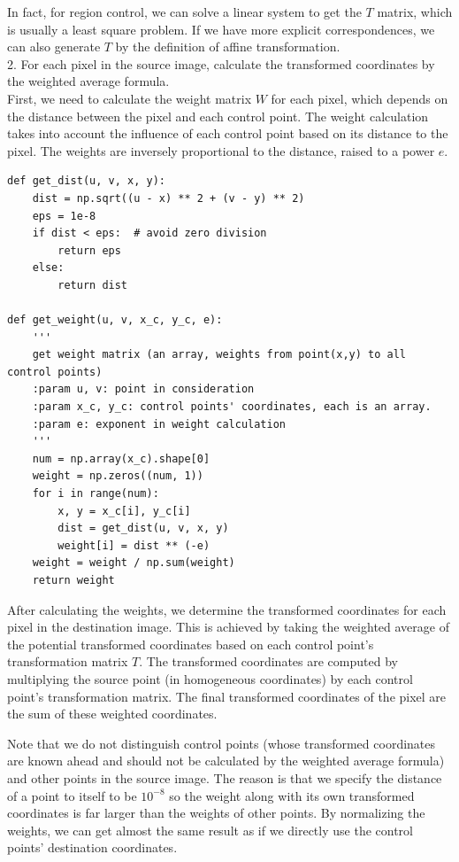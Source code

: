 \documentclass[UTF8]{ctexart}
\begin{document}
In fact, for region control, we can solve a linear system to get the $T$ matrix, which is usually a least square problem.
If we have more explicit correspondences, we can also generate $T$ by the definition of affine transformation.\\

2. For each pixel in the source image, calculate the transformed coordinates by the weighted average formula.\\

First, we need to calculate the weight matrix $W$ for each pixel, which depends on the distance between the pixel and each control point.
The weight calculation takes into account the influence of each control point based on its distance to the pixel.
The weights are inversely proportional to the distance, raised to a power $e$.\\

\begin{lstlisting}
def get_dist(u, v, x, y):
    dist = np.sqrt((u - x) ** 2 + (v - y) ** 2)
    eps = 1e-8
    if dist < eps:  # avoid zero division
        return eps
    else:
        return dist

def get_weight(u, v, x_c, y_c, e):
    '''
    get weight matrix (an array, weights from point(x,y) to all control points)
    :param u, v: point in consideration
    :param x_c, y_c: control points' coordinates, each is an array.
    :param e: exponent in weight calculation
    '''
    num = np.array(x_c).shape[0]
    weight = np.zeros((num, 1))
    for i in range(num):
        x, y = x_c[i], y_c[i]
        dist = get_dist(u, v, x, y)
        weight[i] = dist ** (-e)
    weight = weight / np.sum(weight)
    return weight
\end{lstlisting}

After calculating the weights, we determine the transformed coordinates for each pixel in the destination image.
This is achieved by taking the weighted average of the potential transformed coordinates based on each control point's transformation matrix $T$.
The transformed coordinates are computed by multiplying the source point (in homogeneous coordinates) by each control point's transformation matrix.
The final transformed coordinates of the pixel are the sum of these weighted coordinates.

Note that we do not distinguish control points (whose transformed coordinates are known ahead and should not be calculated by the weighted average formula) and other points
in the source image. The reason is that we specify the distance of a point to itself to be $10^{-8}$ so the weight along with its own transformed coordinates
is far larger than the weights of other points. By normalizing the weights, we can get almost the same result as if we directly use the control points' destination coordinates.\\
\end{document}
